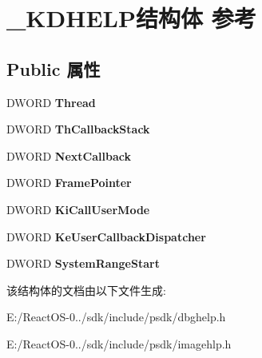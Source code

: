 \hypertarget{struct___k_d_h_e_l_p}{}\section{\+\_\+\+K\+D\+H\+E\+L\+P结构体 参考}
\label{struct___k_d_h_e_l_p}
\subsection*{Public 属性}
\begin{DoxyCompactItemize}
\item 
\mbox{\label{struct___k_d_h_e_l_p_abf50eb8d378da009e32039038ce17426}} 
D\+W\+O\+RD {\bfseries Thread}
\item 
\mbox{\label{struct___k_d_h_e_l_p_ae422bc4953321d2c67b3b1a837743eb7}} 
D\+W\+O\+RD {\bfseries Th\+Callback\+Stack}
\item 
\mbox{\label{struct___k_d_h_e_l_p_a7b8207a07b00770bb4b2deb3ec299833}} 
D\+W\+O\+RD {\bfseries Next\+Callback}
\item 
\mbox{\label{struct___k_d_h_e_l_p_a1827fee89f83d181faaea58e43f04dc8}} 
D\+W\+O\+RD {\bfseries Frame\+Pointer}
\item 
\mbox{\label{struct___k_d_h_e_l_p_a5b15de801966865e157a6ce589877cf6}} 
D\+W\+O\+RD {\bfseries Ki\+Call\+User\+Mode}
\item 
\mbox{\label{struct___k_d_h_e_l_p_a6d947fa4de088d122e063d66a9ea1253}} 
D\+W\+O\+RD {\bfseries Ke\+User\+Callback\+Dispatcher}
\item 
\mbox{\label{struct___k_d_h_e_l_p_a07d7439294198fbe9d0373d706afeb66}} 
D\+W\+O\+RD {\bfseries System\+Range\+Start}
\end{DoxyCompactItemize}


该结构体的文档由以下文件生成\+:\begin{DoxyCompactItemize}
\item 
E\+:/\+React\+O\+S-\/0../sdk/include/psdk/dbghelp.\+h\item 
E\+:/\+React\+O\+S-\/0../sdk/include/psdk/imagehlp.\+h\end{DoxyCompactItemize}
